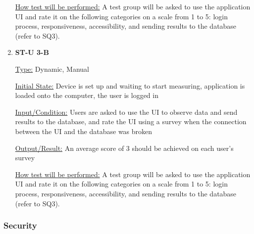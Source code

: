 \documentclass[12pt, titlepage]{article}
\begin{document}
\begin{enumerate}
\underline{How test will be performed:} A test group will be asked to use the application UI and rate it on the following categories on a scale from 1 to 5: login process, responsiveness, accessibility, and sending results to the database (refer to SQ3).
\item{\bf{ST-U 3-B}}

\underline{Type:} Dynamic, Manual
					
\underline{Initial State:} Device is set up and waiting to start measuring, application is loaded onto the computer, the user is logged in
					
\underline{Input/Condition:} Users are asked to use the UI to observe data and send results to the database, and rate the UI using a survey when the connection between the UI and the database was broken
					
\underline{Output/Result:} An average score of 3 should be achieved on each user's survey
					
\underline{How test will be performed:} A test group will be asked to use the application UI and rate it on the following categories on a scale from 1 to 5: login process, responsiveness, accessibility, and sending results to the database (refer to SQ3).

					
					
					
					

\end{enumerate}

\subsubsection{Security}
\end{document}
